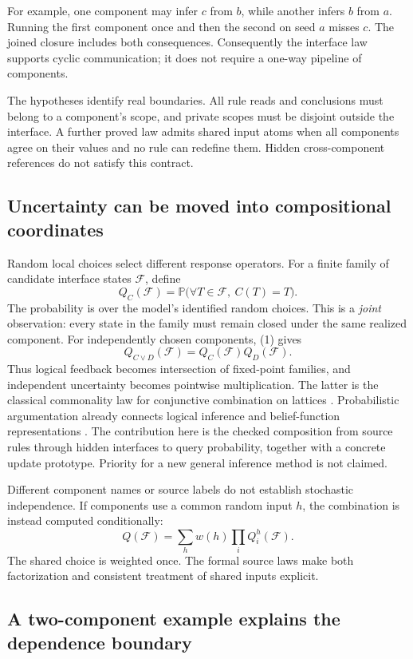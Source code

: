\documentclass[11pt,a4paper]{article}
\newcommand{\Prob}{\mathbb P}
\begin{document}
For example, one component may infer $c$ from $b$, while another infers $b$
from $a$. Running the first component once and then the second on seed $a$
misses $c$. The joined closure includes both consequences. Consequently the
interface law supports cyclic communication; it does not require a one-way
pipeline of components.

The hypotheses identify real boundaries. All rule reads and conclusions must
belong to a component's scope, and private scopes must be disjoint outside the
interface. A further proved law admits shared input atoms when all components
agree on their values and no rule can redefine them. Hidden cross-component
references do not satisfy this contract.

\subsection{Uncertainty can be moved into compositional coordinates}

Random local choices select different response operators. For a finite family
of candidate interface states $\mathcal F$, define
\[
 Q_C(\mathcal F)
   =\Prob\bigl(\forall T\in\mathcal F,\ C(T)=T\bigr).
 \tag{2}
\]
The probability is over the model's identified random choices.
This is a \emph{joint} observation: every state in the family must remain
closed under the same realized component. For independently chosen components,
(1) gives
\[
 Q_{C\vee D}(\mathcal F)=Q_C(\mathcal F)Q_D(\mathcal F).
 \tag{3}
\]
Thus logical feedback becomes intersection of fixed-point families, and
independent uncertainty becomes pointwise multiplication. The latter is the
classical commonality law for conjunctive combination on lattices
\cite{denoeux}. Probabilistic argumentation already connects logical inference
and belief-function representations \cite{haenni}. The contribution here is
the checked composition from source rules through hidden interfaces to query
probability, together with a concrete update prototype. Priority for a new
general inference method is not claimed.

Different component names or source labels do not establish stochastic
independence. If components use a common random input $h$, the combination is
instead computed conditionally:
\[
 Q(\mathcal F)=\sum_h w(h)\prod_i Q_i^h(\mathcal F).
 \tag{4}
\]
The shared choice is weighted once. The formal source laws make both
factorization and consistent treatment of shared inputs explicit.

\subsection{A two-component example explains the dependence boundary}
\end{document}
